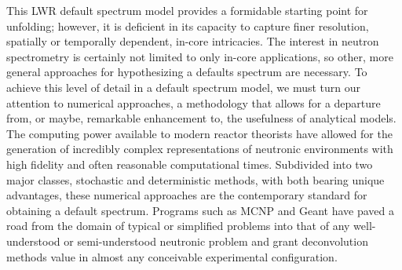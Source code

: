 This LWR default spectrum model provides a formidable starting point for unfolding; however, it is deficient in its capacity to capture finer resolution, spatially or temporally dependent, in-core intricacies.
The interest in neutron spectrometry is certainly not limited to only in-core applications, so other, more general approaches for hypothesizing a defaults spectrum are necessary.
To achieve this level of detail in a default spectrum model, we must turn our attention to numerical approaches, a methodology that allows for a departure from, or maybe, remarkable enhancement to, the usefulness of analytical models.
The computing power available to modern reactor theorists have allowed for the generation of incredibly complex representations of neutronic environments with high fidelity and often reasonable computational times.
Subdivided into two major classes, stochastic and deterministic methods, with both bearing unique advantages, these numerical approaches are the contemporary standard for obtaining a default spectrum.
Programs such as MCNP and Geant have paved a road from the domain of typical or simplified problems into that of any well-understood or semi-understood neutronic problem and grant deconvolution methods value in almost any conceivable experimental configuration.





